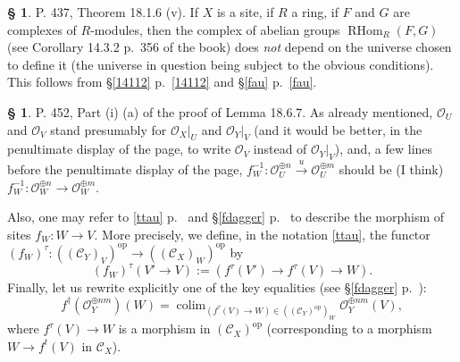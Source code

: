 \documentclass[12pt]{article}%
\theoremstyle{remark}
\theoremstyle{definition}
\newtheorem{s}[thm]{\S}%
\newcommand{\cc}{\mathcal}
\newcommand{\C}{\mathcal C}
\newcommand{\xr}{\xrightarrow}
\DeclareMathOperator*{\colim}{colim}
\DeclareMathOperator{\RHom}{RHom}
\DeclareMathOperator{\op}{op}
\begin{document}
%


%

\begin{s}
P. 437, Theorem 18.1.6 (v). If $X$ is a site, if $R$ a ring, if $F$ and $G$ are complexes of $R$-modules, then the complex of abelian groups $\RHom_R(F,G)$ (see Corollary 14.3.2 p.~356 of the book) does {\em not} depend on the universe chosen to define it (the universe in question being subject to the obvious conditions). This follows from \S\ref{14112} p.~\ref{14112} and \S\ref{fau} p.~\ref{fau}. 
\end{s}

%

\begin{s}
P. 452, Part (i) (a) of the proof of Lemma 18.6.7. As already mentioned, $\cc O_U$ and $\cc O_V$ stand presumably for $\cc O_X|_U$ and $\cc O_Y|_V$ (and it would be better, in the penultimate display of the page, to write $\cc O_V$ instead of $\cc O_Y|_V$), and, a few lines before the penultimate display of the page, $f_W^{-1}:\cc O_U^{\oplus n}\xr u\cc O_U^{\oplus m}$ should be (I think) $f_W^{-1}:\cc O_W^{\oplus n}\to\cc O_W^{\oplus m}$. 

Also, one may refer to \eqref{ttau} p.~\pageref{ttau} and \S\ref{fdagger} p.~\pageref{fdagger} to describe the morphism of sites $f_W:W\to V$. More precisely, we define, in the notation \eqref{ttau}, the functor $(f_W)^\tau:((\C_Y)_V)^{\op}\to((\C_X)_W)^{\op}$ by
$$
(f_W)^\tau(V'\to V):=(f^\tau(V')\to f^\tau(V)\to W).
$$
Finally, let us rewrite explicitly one of the key equalities (see \S\ref{fdagger} p.~\pageref{fdagger}): 
$$
f^\dagger(\cc O_Y^{\oplus nm})(W)=\colim_{(f^\tau(V)\to W)\in((\C_Y)^{\op})_W}\cc O_Y^{\oplus nm}(V),
$$ 
where $f^\tau(V)\to W$ is a morphism in $(\C_X)^{\op}$ (corresponding to a morphism $W\to f^t(V)$ in $\C_X$).
\end{s}
\printindex
\end{document}
